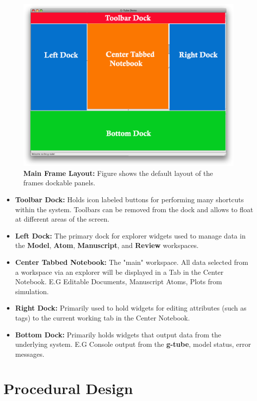 \documentclass[12pt]{article}
\begin{document}
\begin{figure}[ht]
   \centering
   \includegraphics[scale=0.6]{figures/RealEstate.eps}
   \caption{{\bf Main Frame Layout:} Figure shows the default layout of the frames dockable panels.}
   \label{fig:Real Estate}
\end{figure}

\begin{itemize}
\item[] {\bf Toolbar Dock:} Holds icon labeled buttons for performing many shortcuts within the system. Toolbars can be removed from the dock and allows to float at different areas of the screen.
\item[] {\bf Left Dock:} The primary dock for explorer widgets used to manage data in the {\bf Model}, {\bf Atom}, {\bf Manuscript}, and {\bf Review} workspaces.
\item[] {\bf Center Tabbed Notebook:} The "main" workspace. All data selected from a workspace via an explorer will be displayed in a Tab in the Center Notebook. E.G Editable Documents, Manuscript Atoms, Plots from simulation.
\item[] {\bf Right Dock:} Primarily used to hold widgets for editing attributes (such as tags) to the current working tab in the Center Notebook.
\item[] {\bf Bottom Dock:} Primarily holds widgets that output data from the underlying system. E.G Console output from the {\bf g-tube}, model status, error messages.
\end{itemize}

\section*{Procedural Design}
\end{document}
